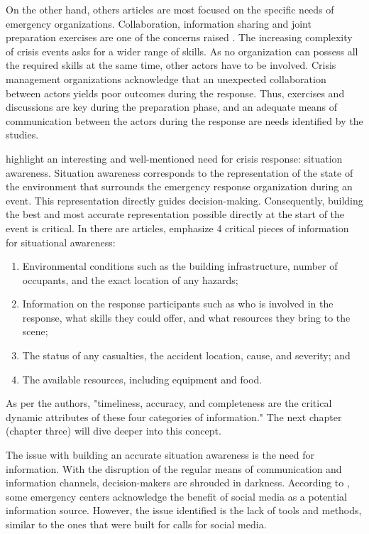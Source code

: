 On the other hand, others articles are most focused on the specific needs of emergency organizations.
Collaboration, information sharing and joint preparation exercises are one of the concerns raised \parencite{berlinWhyCollaborationMinimised2011,parkerSurfaceWaterFlood2011}.
The increasing complexity of crisis events asks for a wider range of skills.
As no organization can possess all the required skills at the same time, other actors have to be involved.
Crisis management organizations acknowledge that an unexpected collaboration between actors yields poor outcomes during the response.
Thus, exercises and discussions are key during the preparation phase, and an adequate means of communication between the actors during the response are needs identified by the studies.

\textcite{yangDesignPrinciplesIntegrated2012} highlight an interesting and well-mentioned need for crisis response: situation awareness.
Situation awareness corresponds to the representation of the state of the environment that surrounds the emergency response organization during an event.
This representation directly guides decision-making.
Consequently, building the best and most accurate representation possible directly at the start of the event is critical.
In there are articles, \citeauthor{yangDesignPrinciplesIntegrated2012} emphasize 4 critical pieces of information for situational awareness:

\begin{enumerate}
    \item Environmental conditions such as the building infrastructure, number of occupants, and the exact location of any hazards;
    \item Information on the response participants such as who is involved in the response, what skills they could offer, and what resources they bring to the scene;
    \item The status of any casualties, the accident location, cause, and severity; and
    \item The available resources, including equipment and food.
\end{enumerate}

As per the authors, "timeliness, accuracy, and completeness are the critical dynamic attributes of these four categories of information."
The next chapter (chapter three) will dive deeper into this concept.

The issue with building an accurate situation awareness is the need for information.
With the disruption of the regular means of communication and information channels, decision-makers are shrouded in darkness.
According to \textcite{tapiaTrustworthyTweetDeeper2013,cobbDesigningDelugeUnderstanding2014}, some emergency centers acknowledge the benefit of social media as a potential information source.
However, the issue identified is the lack of tools and methods, similar to the ones that were built for calls for social media.

